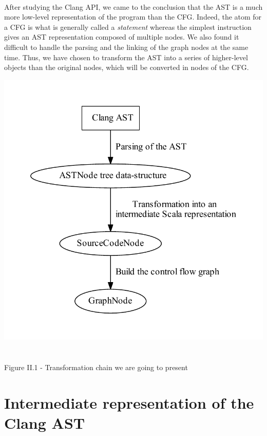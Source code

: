 \documentclass{report}
\begin{document}
\paragraph{}
\hspace{4mm}After studying the Clang API, we came to the conclusion that the AST is a much more low-level representation of the program than the CFG. 
Indeed, the atom for a CFG is what is generally called a \textit{statement} whereas the simplest instruction
gives an AST representation composed of multiple nodes. We also found it difficult to handle the parsing and the linking of the graph nodes at the same time.
Thus, we have chosen to transform the AST into a series of higher-level objects than the original nodes, which will be converted
in nodes of the CFG.

\begin{center}
\includegraphics[scale=0.5]{data/transform_chain}
~\\~\\Figure II.1 - Transformation chain we are going to present
\end{center}

\section{Intermediate representation of the Clang AST}
\end{document}
